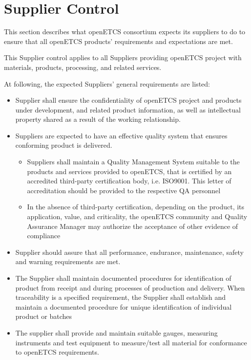 \documentclass{template/openetcs_article}
\begin{document}
\section{Supplier Control}


This section describes what openETCS consortium expects its suppliers to do to
ensure that all openETCS products' requirements and expectations are met.

This Supplier control applies to all Suppliers providing openETCS project with materials, products, processing, and related services.

At following, the expected Suppliers' general requirements are listed:

\begin{itemize}
\item Supplier shall ensure the confidentiality of openETCS project and products under development, and related product information, as well as \gls{intellectual property} shared as a result of the working relationship.
\item Suppliers are expected to have an effective quality system that ensures conforming product is delivered.
\begin{itemize}
\item Suppliers shall maintain a Quality Management System suitable to the products and services provided to openETCS, that is certified by an accredited third-party certification body, i.e. ISO9001. This letter of accreditation should be provided to the respective QA personnel
\item In the absence of third-party certification, depending on the product, its application, value, and criticality, the openETCS community and Quality Assurance Manager may authorize the acceptance of other evidence of compliance
\end{itemize}
\item Supplier should assure that all performance, endurance, maintenance, safety and warning requirements are met.
\item The Supplier shall maintain documented procedures for identification of product from receipt and during processes of production and delivery. When traceability is a specified requirement, the Supplier shall establish and maintain a documented procedure for unique identification of individual product or batches
\item The supplier shall provide and maintain suitable gauges, measuring instruments and test equipment to measure/test all material for conformance to openETCS requirements.

\end{itemize}
\end{document}
